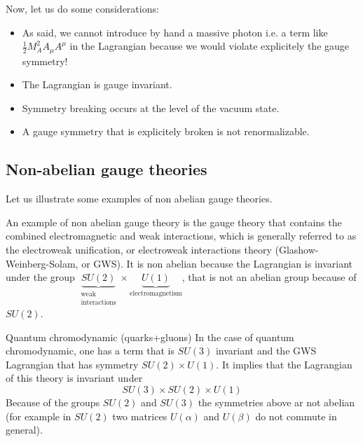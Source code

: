 \documentclass[../main/main.tex]{subfiles}
\begin{document}
Now, let us do some considerations:

\begin{itemize}
\item As said, we cannot introduce by hand a massive photon i.e. a term like \( \frac{1}{2} M_A^2 A_ \mu A ^\mu  \) in the Lagrangian because we would violate explicitely the gauge symmetry!
\item The Lagrangian is gauge invariant.
\item Symmetry breaking occurs at the level of the vacuum state.
\item A gauge symmetry that is explicitely broken is not renormalizable.
\end{itemize}





\subsection{Non-abelian gauge theories}
Let us illustrate some examples of non abelian gauge theories.

\begin{example}{}{}
An example of non abelian gauge theory is the gauge theory that contains the combined electromagnetic and weak interactions, which is generally referred to as the electroweak unification, or electroweak interactions theory (Glashow-Weinberg-Solam, or GWS). It is non abelian because the Lagrangian is invariant under the group \( \underbrace{S U (2)}_{\substack{ \text{weak} \\  \text{interactions} } }  \times \underbrace{U(1)}_{\text{electromagnetism}}  \), that is not an abelian group because of \( S U(2) \).
\end{example}

\begin{example}{Quantum chromodynamic (quarks+gluons)}{}
In the case of quantum chromodynamic, one has a term that is \( SU(3) \) invariant and the GWS Lagrangian that has symmetry \( SU(2) \times U(1) \). It implies that the Lagrangian of this theory is invariant under
  \begin{equation}
    SU(3) \times SU(2) \times U(1)
  \end{equation}
Because of the groups \( SU(2) \) and \( SU(3) \) the symmetries above ar not abelian (for example in \( SU(2) \) two matrices \( U (\alpha ) \) and \( U(\beta ) \) do not commute in general).
\end{example}
\end{document}
